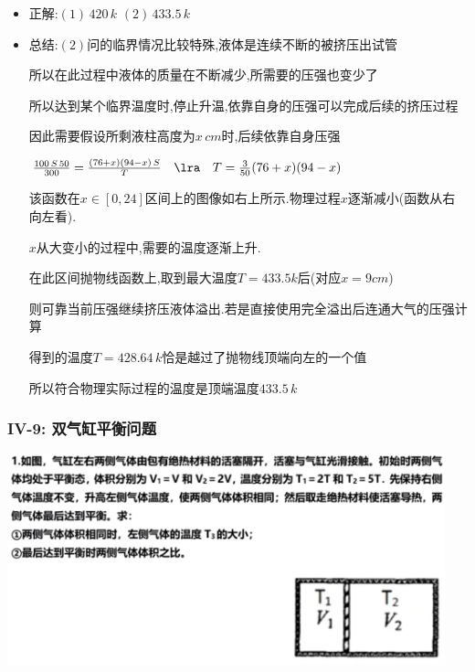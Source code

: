 \documentclass{article}
\begin{document}
\begin{itemize}
    \item 正解:\quad $(1) \, 420 \, k$  $(2) \, 433.5 \, k $
    \item 总结:\quad $(2)$问的临界情况比较特殊,液体是连续不断的被挤压出试管

          \hspace{3.2em}所以在此过程中液体的质量在不断减少,所需要的压强也变少了

          \hspace{3.2em}所以达到某个临界温度时,停止升温,依靠自身的压强可以完成后续的挤压过程

          \hspace{3.2em}因此需要假设所剩液柱高度为$x \, cm$时,后续依靠自身压强

          \hspace{3.2em}$\frac{100 \, S \, 50 }{300} = \frac{(76+x)(94-x) \, S}{T} \quad \lra \quad T = \frac{3}{50} (76+x)(94-x)$

          \hspace{3.2em}该函数在$x \in [0,24] $区间上的图像如右上所示.物理过程$x$逐渐减小(函数从右向左看).

          \hspace{3.2em}$x$从大变小的过程中,需要的温度逐渐上升.

          \hspace{3.2em}在此区间抛物线函数上,取到最大温度$T = 433.5k$后(对应$x=9cm$)

          \hspace{3.2em}则可靠当前压强继续挤压液体溢出.若是直接使用完全溢出后连通大气的压强计算

          \hspace{3.2em}得到的温度$T = 428.64 \, k$恰是越过了抛物线顶端向左的一个值

          \hspace{3.2em}所以符合物理实际过程的温度是顶端温度$433.5 \, k$

\end{itemize}

\vspace{2em}

\subsubsection{IV-9: 双气缸平衡问题}
\includegraphics[width = 0.95\textwidth,keepaspectratio]{./pictures/2.3-21.png}
\end{document}
